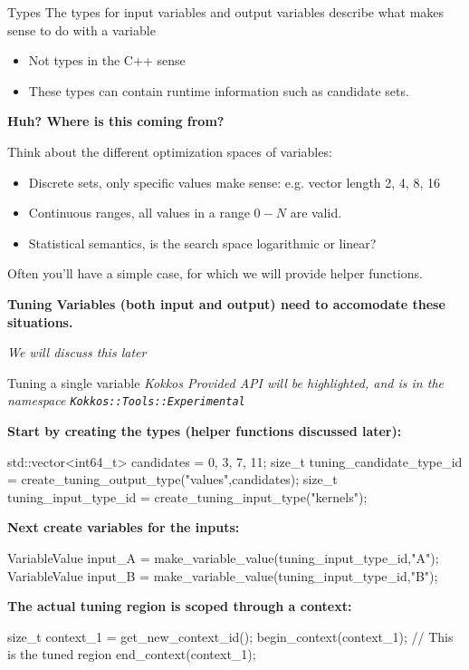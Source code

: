 \begin{frame}[fragile]{Types}
The types for input variables and output variables describe what makes sense to do with a variable
\begin{itemize}
  \item Not types in the C++ sense
  \item These types can contain runtime information such as candidate sets.
\end{itemize}

\pause
\vspace{5pt}
\textbf{Huh? Where is this coming from?}

Think about the different optimization spaces of variables:
\begin{itemize}
\item Discrete sets, only specific values make sense: e.g. vector length 2, 4, 8, 16
\item Continuous ranges, all values in a range $0-N$ are valid.
\item Statistical semantics, is the search space logarithmic or linear?
\end{itemize}

Often you'll have a simple case, for which we will provide helper functions.

\pause
\textbf{Tuning Variables (both input and output) need to accomodate these situations.}

\vspace{5pt}
\textit{We will discuss this later}
\end{frame}

\begin{frame}[fragile]{Tuning a single variable}
\textit{Kokkos Provided API will be highlighted, and is in the namespace \texttt{Kokkos::Tools::Experimental}}

\vspace{5pt}
\textbf{Start by creating the types (helper functions discussed later):}
\begin{code}
std::vector<int64_t> candidates = {0, 3, 7, 11};
size_t tuning_candidate_type_id = 
  create_tuning_output_type("values",candidates);
size_t tuning_input_type_id = 
  create_tuning_input_type("kernels");
\end{code}

\textbf{Next create variables for the inputs:}
\begin{code}[keywords={VariableValue,make_variable_value}]
VariableValue input_A = 
  make_variable_value(tuning_input_type_id,"A");
VariableValue input_B = 
  make_variable_value(tuning_input_type_id,"B");
\end{code}

\textbf{The actual tuning region is scoped through a context:}
\begin{code}[keywords={get_new_context_id,begin_context,end_context}]
size_t context_1 = get_new_context_id();
begin_context(context_1);
// This is the tuned region
end_context(context_1);
\end{code}
\end{frame}


